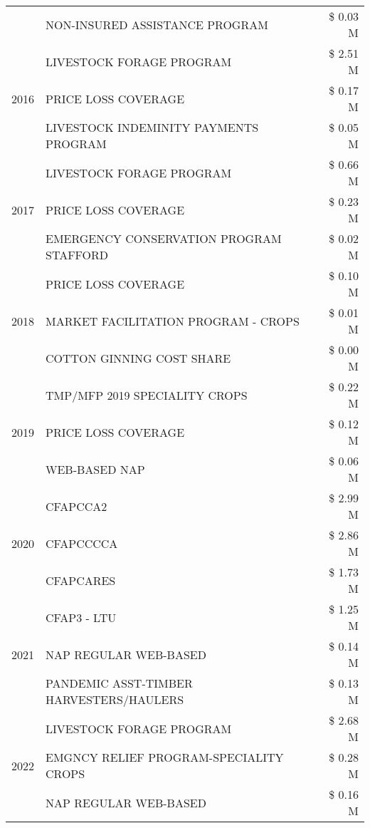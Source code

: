 \begin{tabular}{llr}
 & NON-INSURED ASSISTANCE PROGRAM & \$ 0.03 M \\
\cline{1-3}
\multirow[t]{3}{*}{2016} & LIVESTOCK FORAGE PROGRAM & \$ 2.51 M \\
 & PRICE LOSS COVERAGE & \$ 0.17 M \\
 & LIVESTOCK INDEMINITY PAYMENTS PROGRAM & \$ 0.05 M \\
\cline{1-3}
\multirow[t]{3}{*}{2017} & LIVESTOCK FORAGE PROGRAM & \$ 0.66 M \\
 & PRICE LOSS COVERAGE & \$ 0.23 M \\
 & EMERGENCY CONSERVATION PROGRAM STAFFORD & \$ 0.02 M \\
\cline{1-3}
\multirow[t]{3}{*}{2018} & PRICE LOSS COVERAGE & \$ 0.10 M \\
 & MARKET FACILITATION PROGRAM - CROPS & \$ 0.01 M \\
 & COTTON GINNING COST SHARE & \$ 0.00 M \\
\cline{1-3}
\multirow[t]{3}{*}{2019} & TMP/MFP 2019 SPECIALITY CROPS & \$ 0.22 M \\
 & PRICE LOSS COVERAGE & \$ 0.12 M \\
 & WEB-BASED NAP & \$ 0.06 M \\
\cline{1-3}
\multirow[t]{3}{*}{2020} & CFAPCCA2 & \$ 2.99 M \\
 & CFAPCCCCA & \$ 2.86 M \\
 & CFAPCARES & \$ 1.73 M \\
\cline{1-3}
\multirow[t]{3}{*}{2021} & CFAP3 - LTU & \$ 1.25 M \\
 & NAP REGULAR WEB-BASED & \$ 0.14 M \\
 & PANDEMIC ASST-TIMBER HARVESTERS/HAULERS & \$ 0.13 M \\
\cline{1-3}
\multirow[t]{3}{*}{2022} & LIVESTOCK FORAGE PROGRAM & \$ 2.68 M \\
 & EMGNCY RELIEF PROGRAM-SPECIALITY CROPS & \$ 0.28 M \\
 & NAP REGULAR WEB-BASED & \$ 0.16 M \\
\cline{1-3}
\bottomrule
\end{tabular}
